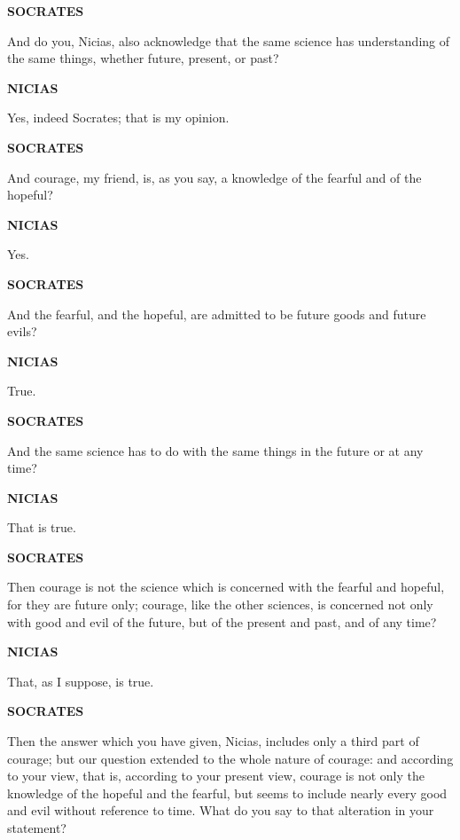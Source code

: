 \documentclass[11pt,letter]{article}
\begin{document}
\par \textbf{SOCRATES}
\par   And do you, Nicias, also acknowledge that the same science has understanding of the same things, whether future, present, or past?

\par \textbf{NICIAS}
\par   Yes, indeed Socrates; that is my opinion.

\par \textbf{SOCRATES}
\par   And courage, my friend, is, as you say, a knowledge of the fearful and of the hopeful?

\par \textbf{NICIAS}
\par   Yes.

\par \textbf{SOCRATES}
\par   And the fearful, and the hopeful, are admitted to be future goods and future evils?

\par \textbf{NICIAS}
\par   True.

\par \textbf{SOCRATES}
\par   And the same science has to do with the same things in the future or at any time?

\par \textbf{NICIAS}
\par   That is true.

\par \textbf{SOCRATES}
\par   Then courage is not the science which is concerned with the fearful and hopeful, for they are future only; courage, like the other sciences, is concerned not only with good and evil of the future, but of the present and past, and of any time?

\par \textbf{NICIAS}
\par   That, as I suppose, is true.

\par \textbf{SOCRATES}
\par   Then the answer which you have given, Nicias, includes only a third part of courage; but our question extended to the whole nature of courage:  and according to your view, that is, according to your present view, courage is not only the knowledge of the hopeful and the fearful, but seems to include nearly every good and evil without reference to time. What do you say to that alteration in your statement?
\end{document}
